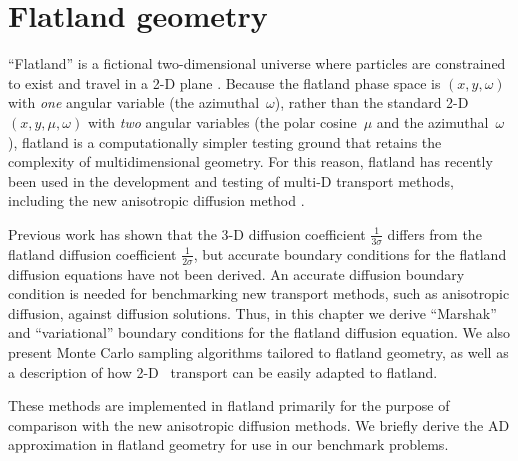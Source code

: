 
\chapter{Flatland geometry}\label{chap:flatland}

``Flatland'' is a fictional two-dimensional universe where particles are
constrained to exist and
travel in a 2-D plane \cite{Asa2008}. Because the flatland phase space is
$(x,y,\omega)$ with \emph{one} angular variable (the azimuthal~$\omega$),
rather than the
standard 2-D $(x,y,\mu,\omega)$ with \emph{two} angular variables (the
polar cosine~$\mu$ and the azimuthal~$\omega$),
flatland is a computationally simpler testing ground that retains the
complexity of multidimensional geometry. For this reason, flatland has recently
been used in the development and testing of multi-D transport methods, including
the new anisotropic diffusion method \cite{Lar2009c,Bor2010,Joh2011,Tra2011}.

Previous work has shown that the 3-D diffusion coefficient
$\frac{1}{3\sigma}$ differs from the flatland diffusion coefficient
$\frac{1}{2\sigma}$, but accurate boundary conditions for the flatland
diffusion equations have not been derived. An accurate diffusion
boundary condition is needed for benchmarking new transport methods, such as
anisotropic diffusion, against
diffusion solutions. Thus, in this chapter we derive ``Marshak''
and ``variational'' boundary conditions for the flatland diffusion equation.
We also present Monte Carlo sampling algorithms tailored to flatland
geometry, as well as a description of how 2-D \SN\ transport can be easily
adapted to flatland.

These methods are implemented in flatland primarily for the purpose of
comparison with the new anisotropic diffusion methods. We briefly derive the
AD approximation in flatland geometry for use in our benchmark problems.

%

